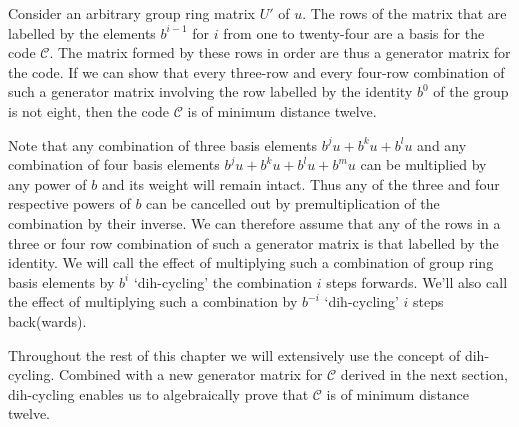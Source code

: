 Consider an arbitrary group ring matrix $U'$ of $u$.
The rows of the matrix that are labelled by the elements $b^{i-1}$ for $i$ from one to twenty-four are a basis for the code $\mathcal{C}$.
The matrix formed by these rows in order are thus a generator matrix for the code.
If we can show that every three-row and every four-row combination of such a generator matrix involving the row labelled by the identity $b^0$ of the group is not eight, then the code $\mathcal{C}$ is of minimum distance twelve.

Note that any combination of three basis elements $b^j u + b^k u + b^l u$ and any combination of four basis elements $b^j u + b^k u + b^l u + b^m u$ can be multiplied by any power of $b$ and its weight will remain intact.
Thus any of the three and four respective powers of $b$ can be cancelled out by premultiplication of the combination by their inverse.
We can therefore assume that any of the rows in a three or four row combination of such a generator matrix is that labelled by the identity.
We will call the effect of multiplying such a combination of group ring basis elements by $b^i$ `dih-cycling' the combination $i$ steps forwards.
We'll also call the effect of multiplying such a combination by $b^{-i}$ `dih-cycling' $i$ steps back(wards).

Throughout the rest of this chapter we will extensively use the concept of dih-cycling.
Combined with a new generator matrix for $\mathcal{C}$ derived in the next section, dih-cycling enables us to algebraically prove that $\mathcal{C}$ is of minimum distance twelve.

